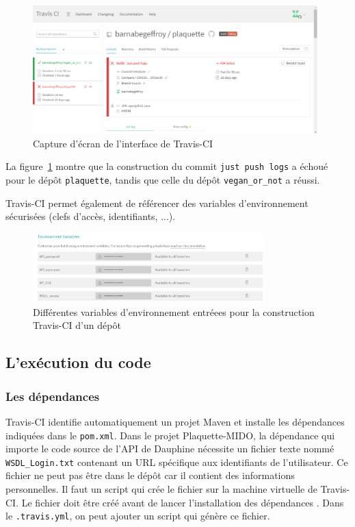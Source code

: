 \begin{figure}[!ht]
    \begin{center}
        \includegraphics[width=11cm]{assets/travis-ci.PNG}
    \end{center}
    \caption{Capture d'écran de l'interface de Travis-CI}
    \label{travis}
\end{figure}

La figure~\ref{travis} montre que la construction du commit \texttt{just push logs} a échoué pour le dépôt \texttt{plaquette}, tandis que celle du dépôt \texttt{vegan\_or\_not} a réussi.

Travis-CI permet également de référencer des variables d'environnement sécurisées (clefs d'accès, identifiants, ...).
\begin{figure}[!ht]
    \begin{center}
    \includegraphics[width=0.8\textwidth]{assets/env.PNG}
    \caption{Différentes variables d'environnement entréees pour la construction Travis-CI d'un dépôt}
    \label{env}
    \end{center}

\end{figure}

\subsection{L'exécution du code}
\subsubsection*{Les dépendances}



Travis-CI identifie automatiquement un projet Maven et installe les dépendances indiquées dans le \texttt{pom.xml}. Dans le projet Plaquette-MIDO, la dépendance qui importe le code source de l'API de Dauphine nécessite un fichier texte nommé \texttt{WSDL\_Login.txt} contenant un URL spécifique aux identifiants de l'utilisateur. Ce fichier ne peut pas être dans le dépôt car il contient des informations personnelles. Il faut un script qui crée le fichier sur la machine virtuelle de Travis-CI. Le fichier doit être créé avant de lancer l'installation des dépendances . Dans le \texttt{.travis.yml}, on peut ajouter un script qui génère ce fichier. 

